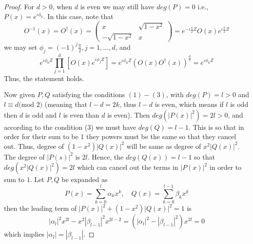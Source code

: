 \documentclass[12pt, oneside]{book}
\theoremstyle{definition}
\theoremstyle{definition}
\theoremstyle{remark}
\begin{document}
\begin{proof}
    For $d > 0$, when $d$ is even we may still have $deg(P)=0$ i.e., $P(x)=e^{\iota \phi_0}$. In this case, note that
    \[
    O^{-1}(x)=O^{\dagger}(x)=\begin{pmatrix} x & \sqrt{1-x^2} \\ -\sqrt{1-x^2} & x \end{pmatrix} = e^{-\iota \frac{\pi}{2}Z}O(x) e^{\iota \frac{\pi}{2}Z}
    \]
    we may set $\phi_j = (-1)^j \frac{\pi}{2}, j =1,\ldots,d$, and
    \[
    e^{\iota \phi_0Z}\prod_{j=1}^d [O(x)e^{\iota \phi_jZ}] = e^{\iota \phi_0Z}(O(x)O^{\dagger}(x))^{\frac{d}{2}} = e^{\iota \phi_0Z}
    \]
    Thus, the statement holds.
    
    Now given $P, Q$ satisfying the conditions $(1)- (3)$, with $deg(P)=l >0$ and $l \equiv d \text{(mod 2)}$ (meaning that $l-d=2k$, thus $l-d$ is even, which means if $l$ is odd then $d$ is odd and $l$ is even than $d$ is even). Then $deg(|P(x)|^2) = 2l > 0$, and according to the condition (3) we must have $deg(Q) = l-1$. This is so that in order for their sum to be 1 they powers must be the same so that they cancel out. Thus, degree of $(1-x^2)|Q(x)|^2$ will be same as degree of $x^2|Q(x)|^2$. The degree of $|P(s)|^2$ is $2l$. Hence, the $deg(Q(x))=l-1$ so that $deg(x^2|Q(x)|^2)=2l$ which can cancel out the terms in $|P(x)|^2$ in order to sum to $1$. Let $P, Q$ be expanded as
    \[
    P(x) = \sum_{k=0}^l \alpha_k x^k, \quad Q(x)=\sum_{k=0}^{l-1} \beta_k x^k
    \]
    then the leading term of $|P(x)|^2 + (1-x^2)|Q(x)|^2=1$ is
    \[
    |\alpha_l|^2x^{2l}-x^2|\beta_{l-1}|^2x^{2l-2} = (|\alpha_l|^2-|\beta_{l-1}|^2)x^{2l}=0
    \]
    which implies $|\alpha_l|=|\beta_{l-1}|$.


\end{proof}
\end{document}
